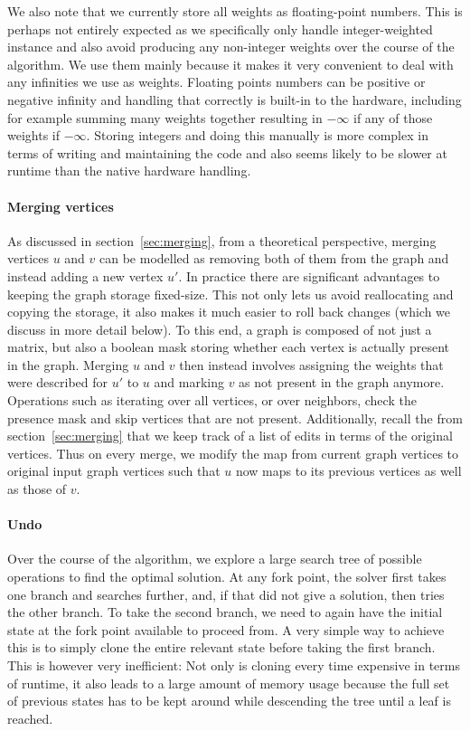 \documentclass[12pt,oneside,english,parskip=full,headings=small]{scrbook}
\theoremstyle{definition}
\begin{document}
We also note that we currently store all weights as floating-point numbers. This is perhaps not
entirely expected as we specifically only handle integer-weighted instance and also avoid producing
any non-integer weights over the course of the algorithm. We use them mainly because it makes it
very convenient to deal with any infinities we use as weights. Floating points numbers can be
positive or negative infinity and handling that correctly is built-in to the hardware, including for
example summing many weights together resulting in $-\infty$ if any of those weights if $-\infty$.
Storing integers and doing this manually is more complex in terms of writing and maintaining the
code and also seems likely to be slower at runtime than the native hardware handling.

\paragraph{Merging vertices} As discussed in section~\ref{sec:merging}, from a theoretical
perspective, merging vertices $u$ and $v$ can be modelled as removing both of them from the graph
and instead adding a new vertex $u'$. In practice there are significant advantages to keeping the
graph storage fixed-size. This not only lets us avoid reallocating and copying the storage, it also
makes it much easier to roll back changes (which we discuss in more detail below). To this end, a
graph is composed of not just a matrix, but also a boolean mask storing whether each vertex is
actually present in the graph. Merging $u$ and $v$ then instead involves assigning the weights that
were described for $u'$ to $u$ and marking $v$ as not present in the graph anymore. Operations such
as iterating over all vertices, or over neighbors, check the presence mask and skip vertices that
are not present. Additionally, recall the from section~\ref{sec:merging} that we keep track of a
list of edits in terms of the original vertices. Thus on every merge, we modify the map from current
graph vertices to original input graph vertices such that $u$ now maps to its previous vertices as
well as those of $v$.

\paragraph{Undo} Over the course of the algorithm, we explore a large search tree of possible
operations to find the optimal solution. At any fork point, the solver first takes one branch and
searches further, and, if that did not give a solution, then tries the other branch. To take the
second branch, we need to again have the initial state at the fork point available to proceed from.
A very simple way to achieve this is to simply clone the entire relevant state before taking the
first branch. This is however very inefficient: Not only is cloning every time expensive in terms of
runtime, it also leads to a large amount of memory usage because the full set of previous states has
to be kept around while descending the tree until a leaf is reached.
\end{document}

